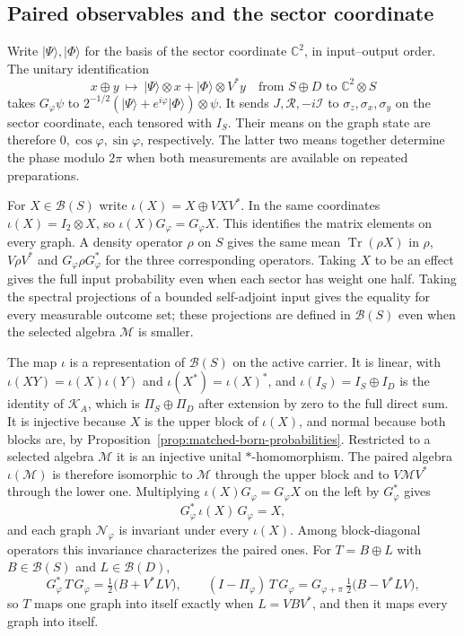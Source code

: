 \documentclass[11pt]{article}
\theoremstyle{definition}
\DeclareMathOperator{\Tr}{Tr}
\newcommand{\C}{\mathbb C}
\newcommand{\ket}[1]{\lvert #1\rangle}
\begin{document}
\subsection{Paired observables and the sector coordinate}

Write $\ket{\Psi},\ket{\Phi}$ for the basis of the sector coordinate $\C^2$, in input--output order. The unitary identification
\[
 x\oplus y\ \longmapsto\ \ket{\Psi}\otimes x+\ket{\Phi}\otimes V^*y
 \quad\text{from }S\oplus D\text{ to }\C^2\otimes S
\]
takes $G_\varphi\psi$ to $2^{-1/2}(\ket{\Psi}+e^{i\varphi}\ket{\Phi})\otimes\psi$.
It sends $J,\mathcal R,-i\mathcal I$ to $\sigma_z,\sigma_x,\sigma_y$ on the sector coordinate, each tensored with $I_S$. Their means on the graph state are therefore $0,\cos\varphi,\sin\varphi$, respectively. The latter two means together determine the phase modulo $2\pi$ when both measurements are available on repeated preparations.

For $X\in\mathcal B(S)$ write $\iota(X)=X\oplus VXV^*$. In the same coordinates $\iota(X)=I_2\otimes X$, so $\iota(X)G_\varphi=G_\varphi X$. This identifies the matrix elements on every graph. A density operator $\rho$ on $S$ gives the same mean $\Tr(\rho X)$ in $\rho$, $V\rho V^*$ and $G_\varphi\rho G_\varphi^*$ for the three corresponding operators. Taking $X$ to be an effect gives the full input probability even when each sector has weight one half. Taking the spectral projections of a bounded self-adjoint input gives the equality for every measurable outcome set; these projections are defined in $\mathcal B(S)$ even when the selected algebra $\mathcal M$ is smaller.

The map $\iota$ is a representation of $\mathcal B(S)$ on the active carrier. It is linear, with $\iota(XY)=\iota(X)\iota(Y)$ and $\iota(X^*)=\iota(X)^*$, and $\iota(I_S)=I_S\oplus I_D$ is the identity of $\mathcal K_A$, which is $\Pi_S\oplus\Pi_D$ after extension by zero to the full direct sum. It is injective because $X$ is the upper block of $\iota(X)$, and normal because both blocks are, by Proposition~\ref{prop:matched-born-probabilities}. Restricted to a selected algebra $\mathcal M$ it is an injective unital $*$-homomorphism. The paired algebra $\iota(\mathcal M)$ is therefore isomorphic to $\mathcal M$ through the upper block and to $V\mathcal MV^*$ through the lower one. Multiplying $\iota(X)G_\varphi=G_\varphi X$ on the left by $G_\varphi^*$ gives
\begin{equation}
 G_\varphi^*\,\iota(X)\,G_\varphi=X ,
 \label{eq:graph-paired-compression}
\end{equation}
and each graph $\mathcal N_\varphi$ is invariant under every $\iota(X)$. Among block-diagonal operators this invariance characterizes the paired ones. For $T=B\oplus L$ with $B\in\mathcal B(S)$ and $L\in\mathcal B(D)$,
\[
 G_\varphi^*\,T\,G_\varphi=\tfrac12\bigl(B+V^*LV\bigr),\qquad
 (I-\Pi_\varphi)\,T\,G_\varphi=G_{\varphi+\pi}\,\tfrac12\bigl(B-V^*LV\bigr),
\]
so $T$ maps one graph into itself exactly when $L=VBV^*$, and then it maps every graph into itself.
\end{document}
